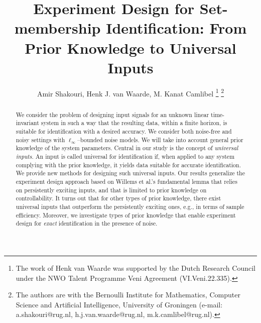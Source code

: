\documentclass[journal,twoside,web]{ieeecolor}
\begin{document}
\title{Experiment Design for Set-membership Identification: From Prior Knowledge to Universal Inputs}
\author{Amir Shakouri, %
Henk J. van Waarde, M. Kanat Camlibel%
\thanks{The work of Henk van Waarde was supported by
the Dutch Research Council under the NWO Talent Programme Veni
Agreement (VI.Veni.22.335).}
\thanks{The authors are with the Bernoulli Institute for Mathematics, Computer Science and Artificial Intelligence, University of Groningen (e-mail: a.shakouri@rug.nl, h.j.van.waarde@rug.nl, m.k.camlibel@rug.nl). }
}

\maketitle

\thispagestyle{empty}
\pagestyle{empty}

\begin{abstract}
We consider the problem of designing input signals for an unknown linear time-invariant system in such a way that the resulting data, within a finite horizon, is suitable for identification with a desired accuracy. We consider both noise-free and noisy settings with $\ell_\infty$--bounded noise models. We will take into account general prior knowledge of the system parameters. Central in our study is the concept of \emph{universal inputs}. An input is called universal for identification if, when applied to any system complying with the prior knowledge, it yields data suitable for accurate identification. We provide new methods for designing such universal inputs. Our results generalize the experiment design approach based on Willems et al.'s fundamental lemma that relies on persistently exciting inputs, and that is limited to prior knowledge on controllability. It turns out that for other types of prior knowledge, there exist universal inputs that outperform the persistently exciting ones, e.g., in terms of sample efficiency. Moreover, we investigate types of prior knowledge that enable experiment design for \emph{exact} identification in the presence of noise.
\end{abstract}
\end{document}
